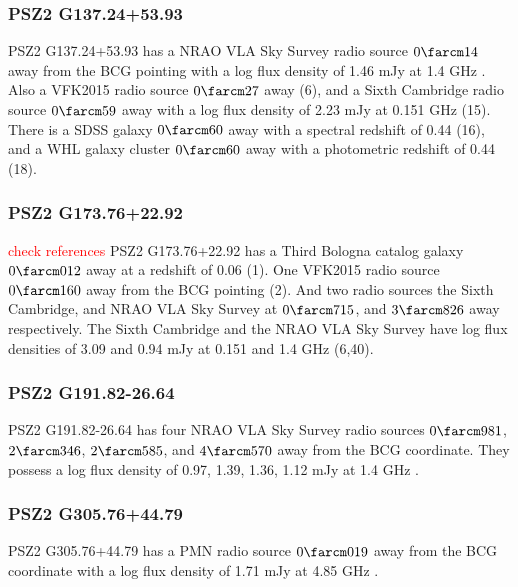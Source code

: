 \documentclass[apj, revtex4-1]{emulateapj}
\newcommand{\editorial}[1]{\textcolor{red}{#1}}
\begin{document}
\subsubsection{PSZ2 G137.24+53.93}
PSZ2 G137.24+53.93 has a NRAO VLA Sky Survey radio source $0\farcm14$ away from the BCG pointing with a log flux density of 1.46 mJy at 1.4 GHz \citep{Condon1998}. Also a VFK2015 radio source $0\farcm27$ away (6), and a Sixth Cambridge radio source $0\farcm59$ away with a log flux density of 2.23 mJy at 0.151 GHz (15). There is a SDSS galaxy $0\farcm60$ away with a spectral redshift of 0.44 (16), and a WHL galaxy cluster $0\farcm60$ away with a photometric redshift of 0.44 (18).

\subsubsection{PSZ2 G173.76+22.92}
\editorial{check references}
PSZ2 G173.76+22.92 has a Third Bologna catalog galaxy $0\farcm012$ away at a redshift of 0.06 (1). One VFK2015 radio source $0\farcm160$ away from the BCG pointing (2). And two radio sources the Sixth Cambridge, and NRAO VLA Sky Survey at  $0\farcm715$, and $3\farcm826$ away respectively. The Sixth Cambridge and the NRAO VLA Sky Survey have log flux densities of 3.09 and 0.94 mJy at 0.151 and 1.4 GHz (6,40).

\subsubsection{PSZ2 G191.82-26.64}
PSZ2 G191.82-26.64 has four NRAO VLA Sky Survey radio sources $0\farcm981$, $2\farcm346$, $2\farcm585$, and $4\farcm570$ away from the BCG coordinate. They possess a log flux density of 0.97, 1.39, 1.36, 1.12 mJy at 1.4 GHz \citep{Condon1998}. 

\subsubsection{PSZ2 G305.76+44.79}
PSZ2 G305.76+44.79 has a PMN radio source $0\farcm019$ away from the BCG coordinate with a log flux density of 1.71 mJy at 4.85 GHz \citep{Griffith1993}.


\end{document}
